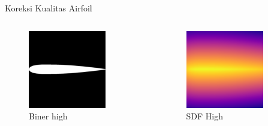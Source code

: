 \begin{frame}{Koreksi Kualitas Airfoil}
\begin{columns}[t]
    \begin{column}{.25\linewidth}
      \begin{figure}[h]
        \centering
        \includegraphics[width=0.8\linewidth]{statics/airfoil_high.png}
        \caption{Biner high}
      \end{figure}
    \end{column}

    \begin{column}{.25\linewidth}
      \begin{figure}[h]
        \centering
        \includegraphics[width=0.8\linewidth]{statics/airfoil_sdf_high.png}
        \caption{SDF High}
      \end{figure}
    \end{column}
  \end{columns}
\end{frame}

